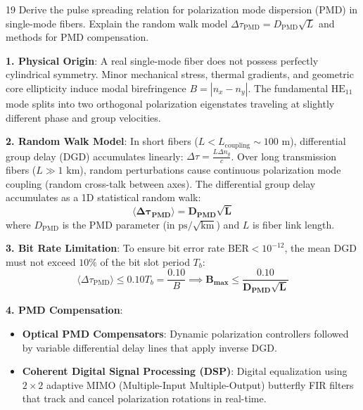 \begin{theoryq}{19}
Derive the pulse spreading relation for polarization mode dispersion (PMD) in single-mode fibers. Explain the random walk model $\Delta \tau_{\text{PMD}} = D_{\text{PMD}}\sqrt{L}$ and methods for PMD compensation.
\end{theoryq}
\begin{theorysol}
\textbf{1. Physical Origin}:
A real single-mode fiber does not possess perfectly cylindrical symmetry. Minor mechanical stress, thermal gradients, and geometric core ellipticity induce modal birefringence $B = |n_x - n_y|$.
The fundamental $\text{HE}_{11}$ mode splits into two orthogonal polarization eigenstates traveling at slightly different phase and group velocities.

\textbf{2. Random Walk Model}:
In short fibers ($L < L_{\text{coupling}} \sim 100\text{ m}$), differential group delay (DGD) accumulates linearly: $\Delta\tau = \frac{L \Delta n_g}{c}$.
Over long transmission fibers ($L \gg 1\text{ km}$), random perturbations cause continuous polarization mode coupling (random cross-talk between axes).
The differential group delay accumulates as a 1D statistical random walk:
\begin{equation}
\mathbf{\langle \Delta \tau_{\text{PMD}} \rangle = D_{\text{PMD}} \sqrt{L}}
\end{equation}
where $D_{\text{PMD}}$ is the PMD parameter (in $\text{ps}/\sqrt{\text{km}}$) and $L$ is fiber link length.

\textbf{3. Bit Rate Limitation}:
To ensure bit error rate $\text{BER} < 10^{-12}$, the mean DGD must not exceed $10\%$ of the bit slot period $T_b$:
\begin{equation}
\langle \Delta \tau_{\text{PMD}} \rangle \le 0.10 T_b = \frac{0.10}{B} \implies \mathbf{B_{\text{max}} \le \frac{0.10}{D_{\text{PMD}}\sqrt{L}}}
\end{equation}

\textbf{4. PMD Compensation}:
\begin{itemize}
    \item \textbf{Optical PMD Compensators}: Dynamic polarization controllers followed by variable differential delay lines that apply inverse DGD.
    \item \textbf{Coherent Digital Signal Processing (DSP)}: Digital equalization using $2 \times 2$ adaptive MIMO (Multiple-Input Multiple-Output) butterfly FIR filters that track and cancel polarization rotations in real-time.
\end{itemize}
\end{theorysol}
\vspace{4mm}

